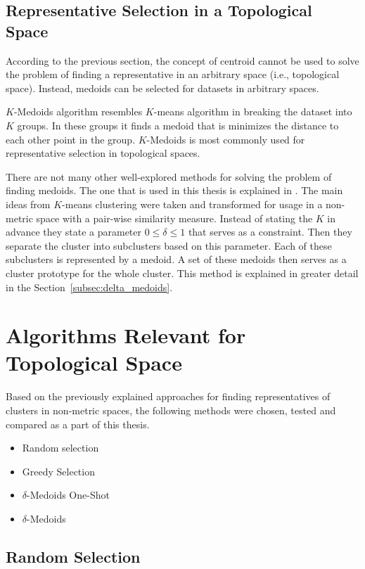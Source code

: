 \documentclass[thesis=B,english]{FITthesis}[2012/10/20]
\begin{document}
\subsection{Representative Selection in a Topological Space}\label{sec:rep_select_arbitrary}
According to the previous section, the concept of centroid cannot be used to solve the problem of finding a representative in an arbitrary space (i.e., topological space).
Instead, medoids can be selected for datasets in arbitrary spaces.

$K$-Medoids algorithm resembles $K$-means algorithm in breaking the dataset into $K$ groups.
In these groups it finds a medoid that is minimizes the distance to each other point in the group.
$K$-Medoids is most commonly used for representative selection in topological spaces.

There are not many other well-explored methods for solving the problem of finding medoids.
The one that is used in this thesis is explained in \cite{liebman2015representative}.
The main ideas from $K$-means clustering were taken and transformed for usage in a non-metric space with a pair-wise similarity measure.
Instead of stating the $K$ in advance they state a parameter  $ 0 \leq \delta \leq 1$ that serves as a constraint.
Then they separate the cluster into subclusters based on this parameter.
Each of these subclusters is represented by a medoid.
A set of these medoids then serves as a cluster prototype for the whole cluster.
This method is explained in greater detail in the Section~\ref{subsec:delta_medoids}.

\section{Algorithms Relevant for Topological Space}\label{sec:relevant_methods}
Based on the previously explained approaches for finding representatives of clusters in non-metric spaces, the following methods were chosen, tested and compared as a part of this thesis.
\begin{itemize}
    \item Random selection
    \item Greedy Selection
    \item $\delta$-Medoids One-Shot
    \item $\delta$-Medoids
\end{itemize}

\subsection{Random Selection}\label{subsec:random_select}
\end{document}
